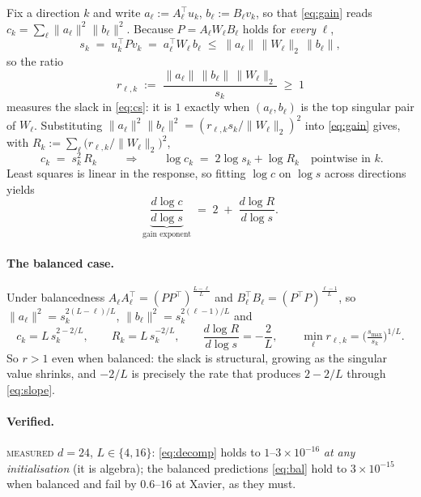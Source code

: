 \documentclass{article}
\newcommand{\RUN}{{\color{blue!70!black}\textsc{measured}}}
\theoremstyle{plain}\newtheorem{theorem}{Theorem}\newtheorem{lemma}[theorem]{Lemma}
\theoremstyle{definition}\newtheorem{definition}[theorem]{Definition}
\begin{document}
Fix a direction $k$ and write $a_\ell:=A_\ell^\top u_k$, $b_\ell:=B_\ell v_k$, so that
\eqref{eq:gain} reads $c_k=\sum_\ell\|a_\ell\|^2\|b_\ell\|^2$. Because
$P=A_\ell W_\ell B_\ell$ holds for \emph{every} $\ell$,
\begin{equation}\label{eq:cs}
  s_k \;=\; u_k^\top P v_k \;=\; a_\ell^\top W_\ell\, b_\ell
      \;\le\; \|a_\ell\|\,\|W_\ell\|_2\,\|b_\ell\| ,
\end{equation}
so the ratio
\begin{equation}\label{eq:r}
  r_{\ell,k} \;:=\; \frac{\|a_\ell\|\,\|b_\ell\|\,\|W_\ell\|_2}{s_k}\;\ge\;1
\end{equation}
measures the slack in \eqref{eq:cs}: it is $1$ exactly when $(a_\ell,b_\ell)$ is the top singular
pair of $W_\ell$. Substituting $\|a_\ell\|^2\|b_\ell\|^2=(r_{\ell,k}s_k/\|W_\ell\|_2)^2$ into
\eqref{eq:gain} gives, with $R_k:=\sum_\ell\big(r_{\ell,k}/\|W_\ell\|_2\big)^2$,
\begin{equation}\label{eq:decomp}
  \boxed{\;c_k \;=\; s_k^{2}\,R_k\;}
  \qquad\Longrightarrow\qquad
  \log c_k \;=\; 2\log s_k + \log R_k \quad\text{pointwise in }k .
\end{equation}
Least squares is linear in the response, so fitting $\log c$ on $\log s$ across directions yields
\begin{equation}\label{eq:slope}
  \underbrace{\frac{d\log c}{d\log s}}_{\text{gain exponent}}
  \;=\; 2 \;+\; \frac{d\log R}{d\log s}.
\end{equation}

\paragraph{The balanced case.} Under balancedness \cite{arora2018optimization}
$A_\ell A_\ell^\top=(PP^\top)^{\frac{L-\ell}{L}}$ and
$B_\ell^\top B_\ell=(P^\top P)^{\frac{\ell-1}{L}}$, so
$\|a_\ell\|^2=s_k^{2(L-\ell)/L}$, $\|b_\ell\|^2=s_k^{2(\ell-1)/L}$ and
\begin{equation}\label{eq:bal}
  c_k = L\,s_k^{2-2/L},\qquad R_k = L\,s_k^{-2/L},\qquad
  \frac{d\log R}{d\log s} = -\frac{2}{L},\qquad
  \min_\ell r_{\ell,k} = \Big(\tfrac{s_{\max}}{s_k}\Big)^{1/L}.
\end{equation}
So $r>1$ even when balanced: the slack is structural, growing as the singular value shrinks, and
$-2/L$ is precisely the rate that produces $2-2/L$ through \eqref{eq:slope}.

\paragraph{Verified.} \RUN{} $d{=}24$, $L\in\{4,16\}$: \eqref{eq:decomp} holds to
$1$--$3\times10^{-16}$ \emph{at any initialisation} (it is algebra); the balanced predictions
\eqref{eq:bal} hold to $3\times10^{-15}$ when balanced and fail by $0.6$--$16$ at Xavier, as they
must.
\end{document}

